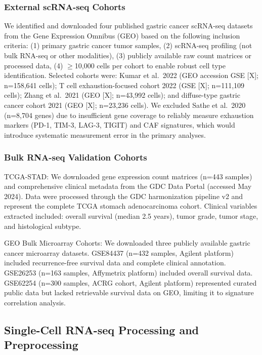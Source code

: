 \documentclass[12pt,twoside]{article}
\begin{document}
\subsubsection{External scRNA-seq Cohorts}

We identified and downloaded four published gastric cancer scRNA-seq datasets from the Gene Expression Omnibus (GEO) based on the following inclusion criteria: (1) primary gastric cancer tumor samples, (2) scRNA-seq profiling (not bulk RNA-seq or other modalities), (3) publicly available raw count matrices or processed data, (4) $\geq$10,000 cells per cohort to enable robust cell type identification. Selected cohorts were: Kumar et al.\ 2022 (GEO accession GSE [X]; n=158,641 cells); T cell exhaustion-focused cohort 2022 (GSE [X]; n=111,109 cells); Zhang et al.\ 2021 (GEO [X]; n=43,992 cells); and diffuse-type gastric cancer cohort 2021 (GEO [X]; n=23,236 cells). We excluded Sathe et al.\ 2020 (n=8,704 genes) due to insufficient gene coverage to reliably measure exhaustion markers (PD-1, TIM-3, LAG-3, TIGIT) and CAF signatures, which would introduce systematic measurement error in the primary analyses.

\subsubsection{Bulk RNA-seq Validation Cohorts}

TCGA-STAD: We downloaded gene expression count matrices (n=443 samples) and comprehensive clinical metadata from the GDC Data Portal (accessed May 2024). Data were processed through the GDC harmonization pipeline v2 and represent the complete TCGA stomach adenocarcinoma cohort. Clinical variables extracted included: overall survival (median 2.5 years), tumor grade, tumor stage, and histological subtype.

GEO Bulk Microarray Cohorts: We downloaded three publicly available gastric cancer microarray datasets. GSE84437 (n=432 samples, Agilent platform) included recurrence-free survival data and complete clinical annotation. GSE26253 (n=163 samples, Affymetrix platform) included overall survival data. GSE62254 (n=300 samples, ACRG cohort, Agilent platform) represented curated public data but lacked retrievable survival data on GEO, limiting it to signature correlation analysis.

\subsection{Single-Cell RNA-seq Processing and Preprocessing}
\end{document}
